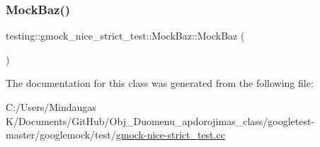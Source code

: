 \mbox{\label{classtesting_1_1gmock__nice__strict__test_1_1_mock_baz_a128aba703e849d19887fc4788c2db4a1}} 
\subsubsection{\texorpdfstring{MockBaz()}{MockBaz()}\hspace{0.1cm}{\footnotesize\ttfamily [2/2]}}
{\footnotesize\ttfamily testing\+::gmock\+\_\+nice\+\_\+strict\+\_\+test\+::\+Mock\+Baz\+::\+Mock\+Baz (\begin{DoxyParamCaption}\item[{\mbox{\hyperlink{classtesting_1_1gmock__nice__strict__test_1_1_mock_baz_1_1_move_only}{Move\+Only}}}]{ }\end{DoxyParamCaption})\hspace{0.3cm}{\ttfamily [inline]}}



The documentation for this class was generated from the following file\+:\begin{DoxyCompactItemize}
\item 
C\+:/\+Users/\+Mindaugas K/\+Documents/\+Git\+Hub/\+Obj\+\_\+\+Duomenu\+\_\+apdorojimas\+\_\+class/googletest-\/master/googlemock/test/\mbox{\hyperlink{googletest-master_2googlemock_2test_2gmock-nice-strict__test_8cc}{gmock-\/nice-\/strict\+\_\+test.\+cc}}\end{DoxyCompactItemize}
